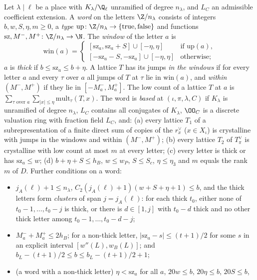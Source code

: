 \begin{definition}[Words]\label{pf:linkN-adm:def-words}
Let $\lambda\mid\ell$ be a place with $K_\lambda/\Q_\ell$ unramified of degree $n_\lambda$, and $L_C$ an admissible
coefficient extension. A \emph{word} on the letters $\Z/n_\lambda$ consists of integers $b,w,S,\eta,m\ge0$, a \emph{type}
$\mathrm{up}\colon\Z/n_\lambda\to\{\mathrm{true},\mathrm{false}\}$ and functions
$\mathrm{sz},M^-,M^+\colon\Z/n_\lambda\to\N$. The \emph{window} of the letter $a$ is
\[
\mathrm{win}(a)=\begin{cases}[\mathrm{sz}_a,\mathrm{sz}_a+S]\cup[-\eta,\eta]&\text{if }\mathrm{up}(a),\\
[-\mathrm{sz}_a-S,-\mathrm{sz}_a]\cup[-\eta,\eta]&\text{otherwise;}\end{cases}
\]
$a$ is \emph{thick} if $b\le\mathrm{sz}_a\le b+\eta$. A lattice $T$ has its jumps \emph{in the windows} if for every
letter $a$ and every $\tau$ over $a$ all jumps of $T$ at $\tau$ lie in $\mathrm{win}(a)$, and \emph{within $(M^-,M^+)$} if
they lie in $[-M^-_a,M^+_a]$. The low count of a lattice $T$ at $a$ is $\sum_{\tau\text{ over }a}\sum_{|x|\le\eta}
\mathrm{mult}_\tau(T,x)$. The word is \emph{based} at $(\iota,\pi,\lambda,C)$ if
$K_\lambda$ is unramified of degree $n_\lambda$, $L_C$ contains all conjugates of $K_\lambda$, $\OO_C$ is a discrete
valuation ring with fraction field $L_C$, and:
(a) every lattice $T_1$ of a subrepresentation of a finite direct sum of copies of the $r^\vee_x$ ($x\in X_\iota$) is
crystalline with jumps in the windows and within $(M^-,M^+)$; (b) every lattice $T_2$ of $T^\vee_\pi$ is crystalline with
low count at most $m$ at every letter; (c) every letter is thick or has $\mathrm{sz}_a\le w$; (d) $b+\eta+S\le h_B$,
$w\le w_P$, $S\le S_c$, $\eta\le\eta_3$ and $m$ equals the rank $m$ of $D$. Further conditions on a word:
\begin{itemize}
\item[(B$_{C_2}$)] $j_A(\ell)+1\le n_\lambda$, $C_2(j_A(\ell)+1)(w+S+\eta+1)\le b$, and the thick letters
  form \emph{clusters} of span $j=j_A(\ell)$: for each thick $t_0$, either none of $t_0-1,\dots,t_0-j$ is thick, or there
  is $d\in[1,j]$ with $t_0-d$ thick and no other thick letter among $t_0-1,\dots,t_0-d-j$;
\item[(Box)] $M^-_a+M^+_a\le2h_B$; for a non-thick letter, $|\mathrm{sz}_a-s|\le(t+1)/2$ for some $s$ in
  an explicit interval $[w''(L),w_B(L)]$; and $b_L-(t+1)/2\le b\le b_L-(t+1)/2+1$;
\item[(NT)] (a word with a non-thick letter) $\eta<\mathrm{sz}_a$ for all $a$, $20w\le b$, $20\eta\le b$, $20S\le b$,

\end{itemize}
\end{definition}
